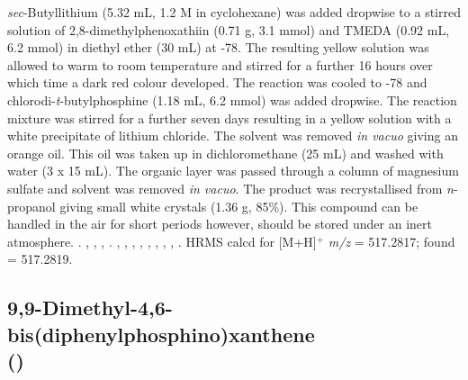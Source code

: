 \noindent{}\emph{sec}-Butyllithium (5.32 mL, 1.2 M in cyclohexane) was added dropwise to a stirred solution of 2,8-dimethylphenoxathiin (0.71 g, 3.1 mmol) and TMEDA (0.92 mL, 6.2 mmol) in diethyl ether (30 mL) at -78\degC{}.  The resulting yellow solution was allowed to warm to room temperature and stirred for a further 16 hours over which time a dark red colour developed.  The reaction was cooled to -78\degC{} and chlorodi-\emph{t}-butylphosphine (1.18 mL, 6.2 mmol) was added dropwise.  The reaction mixture was stirred for a further seven days resulting in a yellow solution with a white precipitate of lithium chloride.  The solvent was removed \emph{in vacuo} giving an orange oil.  This oil was taken up in dichloromethane (25 mL) and washed with water (3 x 15 mL).  The organic layer was passed through a column of magnesium sulfate and solvent was removed \emph{in vacuo}.  The product was recrystallised from \emph{n}-propanol giving small white crystals (1.36 g, 85\%).  This compound can be handled in the air for short periods however, should be stored under an inert atmosphere.
.
,
,
,
.
,
,
,
,
,
,
,
,
.
HRMS calcd for  [M+H]$^+$ \emph{m/z} = 517.2817; found = 517.2819.




\subsection*{9,9-Dimethyl-4,6-bis(diphenylphosphino)xanthene \\(\tBuxantphos)}


